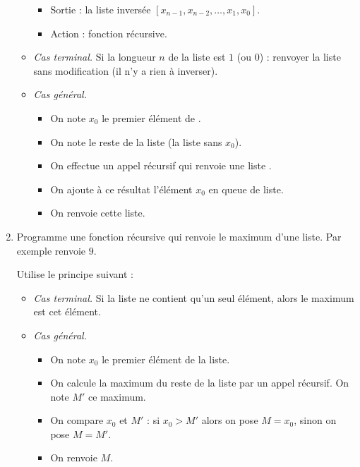 \documentclass[11pt,class=report,crop=false]{standalone}
\begin{document}
\begin{activite}
\begin{enumerate}
\begin{algorithme}
\begin{itemize}
\begin{itemize}
   \item Sortie : la liste inversée $[x_{n-1},x_{n-2},\ldots,x_1,x_0]$. 
 
   \item Action : fonction récursive.
  \end{itemize}

   \item \emph{Cas terminal.} Si la longueur $n$ de la liste est $1$ (ou $0$) : renvoyer la liste sans modification (il n'y a rien à inverser).
    
   \item \emph{Cas général.}
    \begin{itemize}
      \item On note $x_0$ le premier élément de .
      \item On note  le reste de la liste (la liste sans $x_0$).
      \item On effectue un appel récursif  qui renvoie une liste .
      \item On ajoute à ce résultat l'élément $x_0$ en queue de liste.
      \item On renvoie cette liste.
    \end{itemize}
  \end{itemize}
 \end{algorithme} 
 
 \item Programme une fonction récursive  qui renvoie le maximum d'une liste.
 Par exemple  renvoie $9$.
 
  
 
 
 Utilise le principe suivant :
 \begin{itemize}
    \item \emph{Cas terminal.} Si la liste ne contient qu'un seul élément, alors le maximum est cet élément.
    
    \item \emph{Cas général.}
	    \begin{itemize}
	    \item On note $x_0$ le premier élément de la liste.
	    \item On calcule la maximum du reste de la liste par un appel récursif. On note $M'$ ce maximum.
	    \item On compare $x_0$ et $M'$ : si $x_0>M'$ alors on pose $M=x_0$, sinon on pose $M=M'$.
	    \item On renvoie $M$.
		\end{itemize}
  \end{itemize}
    

\end{enumerate}
\end{activite}
\end{document}
